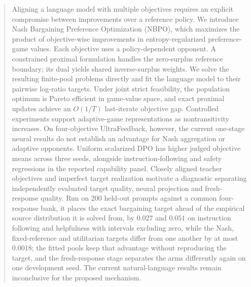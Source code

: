 \documentclass{article}
\theoremstyle{remark}
\theoremstyle{plain}
\newcommand{\NBPO}{\textsc{NBPO}}
\begin{document}
\begin{abstract}
Aligning a language model with multiple objectives requires an explicit compromise between improvements over a reference policy. We introduce Nash Bargaining Preference Optimization (\NBPO{}), which maximizes the product of objective-wise improvements in entropy-regularized preference-game values. Each objective uses a policy-dependent opponent. A constrained proximal formulation handles the zero-surplus reference boundary; its dual yields shared inverse-surplus weights. We solve the resulting finite-pool problems directly and fit the language model to their pairwise log-ratio targets. Under joint strict feasibility, the population optimum is Pareto efficient in game-value space, and exact proximal updates achieve an $O(1/T)$ last-iterate objective gap. Controlled experiments support adaptive-game representations as nontransitivity increases. On four-objective UltraFeedback, however, the current one-stage neural results do not establish an advantage for Nash aggregation or adaptive opponents. Uniform scalarized DPO has higher judged objective means across three seeds, alongside instruction-following and safety regressions in the reported capability panel. Closely aligned teacher objectives and imperfect target realization motivate a diagnostic separating independently evaluated target quality, neural projection and fresh-response quality. Run on $200$ held-out prompts against a common four-response bank, it places the exact bargaining target ahead of the empirical source distribution it is solved from, by $0.027$ and $0.051$ on instruction following and helpfulness with intervals excluding zero, while the Nash, fixed-reference and utilitarian targets differ from one another by at most $0.0018$; the fitted pools keep that advantage without reproducing the target, and the fresh-response stage separates the arms differently again on one development seed. The current natural-language results remain inconclusive for the proposed mechanism.
\end{abstract}
\end{document}

